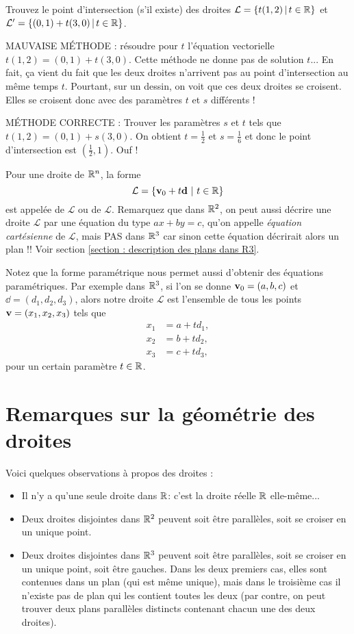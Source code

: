 \begin{myexample}
Trouvez le point d'intersection (s'il existe) des droites $\mathcal L = \{ t(1,2) \,| \, t \in \mathbb{R}\}$ 
et $\mathcal L' = \{ (0,1)+t(3,0) \,|\, t \in \mathbb{R}\}$.

MAUVAISE M\'ETHODE :  résoudre pour $t$ l'équation vectorielle $t(1,2)=(0,1)+t(3,0)$.
Cette méthode ne donne pas de solution $t$... En fait, ça vient du fait que
les deux droites n'arrivent pas au point d'intersection au même temps $t$. Pourtant, sur un dessin, on voit que ces deux droites se croisent. Elles se croisent donc avec des paramètres $t$ et $s$ différents !


MÉTHODE CORRECTE : Trouver les paramètres $s$ et $t$ tels que
  $t(1,2) = (0,1)+s(3,0)$.  On obtient $t=\frac12$ et $s=\frac16$ et donc le point d'intersection est $(\frac12,1)$. Ouf !
\end{myexample}

Pour une droite de $\mathbb{R}^n$, la forme
$$
\mathcal L = \{ \mathbf{v}_0 + t \mathbf{d}~|~ t\in \mathbb{R}\}
$$
 est appelée  de $\mathcal L$ ou  de $\mathcal L$. 
Remarquez que dans $\mathbb{R}^2$, on peut aussi décrire une droite $\mathcal L$ par une équation du type
$ax+by=c$, qu'on appelle \emph{équation cartésienne} de $\mathcal L$, mais PAS dans $\mathbb{R}^3$ car sinon cette équation décrirait alors un plan !! Voir section \ref{section : description des plans dans R3}.

Notez que la forme paramétrique nous permet aussi d'obtenir des équations paramétriques. Par exemple dans $\mathbb{R}^3$, si l'on se donne $\mathbf{v}_0 = (a,b,c)$ et $\dd = (d_1,d_2,d_3)$, alors notre droite $\mathcal L$ est l'ensemble de tous les points $\mathbf{v}=(x_1,x_2,x_3)$ tels que 
\begin{align*}
x_1 &= a+ td_1,\\
x_2 &= b+td_2,\\
x_3 &= c+td_3,
\end{align*}
pour un certain paramètre $t\in \mathbb{R}$.

\section{Remarques sur la géométrie des droites}

Voici quelques observations à propos des droites :
\begin{itemize}
	\item Il n'y a qu'une seule droite dans $\mathbb{R}$: c'est la droite réelle $\mathbb{R}$ elle-même...
	\item Deux droites disjointes dans $\mathbb{R}^2$ peuvent soit être parallèles, soit se croiser en un unique point.
	\item Deux droites disjointes dans $\mathbb{R}^3$ peuvent soit être parallèles, soit se croiser en un unique point, soit être gauches.  Dans les deux premiers cas, elles sont contenues
dans un plan (qui est même unique), mais dans le troisième cas il n'existe pas de plan qui les contient toutes les deux (par contre, on peut trouver deux plans parallèles distincts contenant chacun une des deux droites).
\end{itemize}

